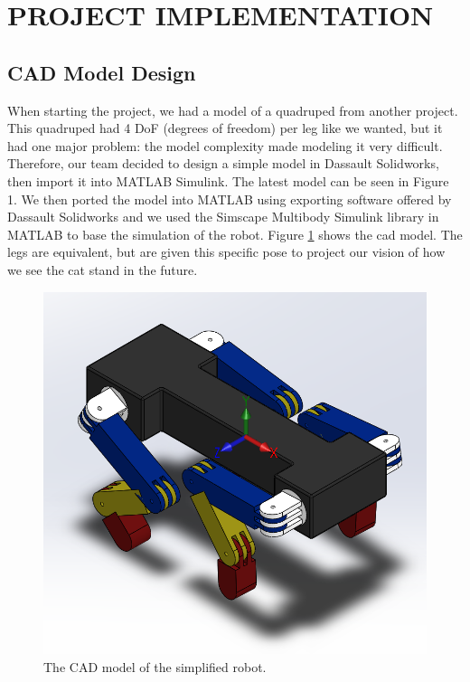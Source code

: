 \section{PROJECT IMPLEMENTATION}
\subsection{CAD Model Design} \label{sec:CAD Model Design}
When starting the project, we had a model of a quadruped from another project. This quadruped had 4 DoF (degrees of freedom) per leg like we wanted, but it had one major problem: the model complexity made modeling it very difficult. Therefore, our team decided to design a simple model in Dassault Solidworks, then import it into MATLAB Simulink. The latest model can be seen in Figure 1.
We then ported the model into MATLAB using exporting software offered by  Dassault Solidworks and we used the Simscape Multibody Simulink library in MATLAB to base the simulation of the robot.
Figure \ref{fig:cadmodel} shows the cad model. The legs are equivalent, but are given this specific pose to project our vision of how we see the cat stand in the future.
\begin{figure}[thpb]
    \parbox{\linewidth}{\includegraphics[width=\linewidth]{Figures/robot.png}}
    \caption{The CAD model of the simplified robot.}
    \label{fig:cadmodel}
\end{figure}


